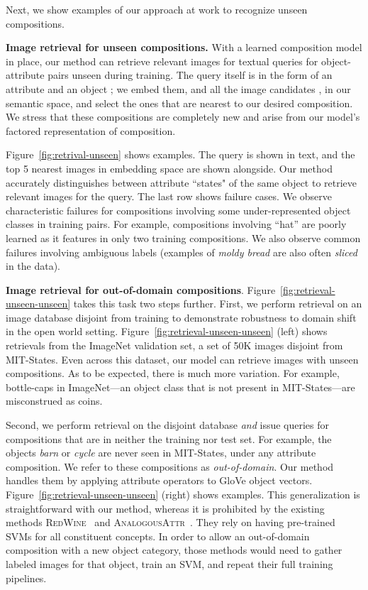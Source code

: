 \documentclass[runningheads]{llncs}
\newcommand{\SC}[1]{{\textsc{#1}}}
\newcommand{\reffig}[1]{Figure~\ref{#1}}
\begin{document}
Next, we show examples of our approach at work to recognize unseen compositions.

\vspace{0.05in}
\noindent\textbf{Image retrieval for unseen compositions.} With a learned composition model in place, our method can retrieve relevant images for textual queries for object-attribute pairs unseen during training. The query itself is in the form of an attribute  and an object ; we embed them, and all the image candidates , in our semantic space, and select the ones that are nearest to our desired composition. We stress that these compositions are completely new and arise from our model's factored representation of composition. 

\reffig{fig:retrival-unseen} shows examples. The query is shown in text, and the top 5 nearest images in embedding space are shown alongside. Our method accurately distinguishes between attribute ``states" of the same object to retrieve relevant images for the query. The last row shows failure cases. We observe characteristic failures for compositions involving some under-represented object classes in training pairs. For example, compositions involving ``hat'' are poorly learned as it features in only two training compositions. We also observe common failures involving ambiguous labels (examples of \emph{moldy bread} are also often \emph{sliced} in the data). 

\vspace{0.05in}
\noindent\textbf{Image retrieval for out-of-domain compositions}. 
\reffig{fig:retrieval-unseen-unseen} takes this task two steps further.  First, we perform retrieval on an image database disjoint from training to demonstrate robustness to domain shift in the open world setting.
\reffig{fig:retrieval-unseen-unseen} (left) shows retrievals from the ImageNet validation set, a set of 50K images disjoint from MIT-States. 
Even across this dataset, our model can retrieve images with unseen compositions. As to be expected, there is much more variation. For example, bottle-caps in ImageNet---an object class that is not present in MIT-States---are misconstrued as coins. 

Second, we perform retrieval on the disjoint database \emph{and} issue queries for compositions that are in neither the training nor test set.  For example, the objects \emph{barn} or \emph{cycle} are never seen in MIT-States, under any attribute composition.
We refer to these compositions as \emph{out-of-domain}. 
Our method handles them by applying attribute operators to GloVe object vectors.
\reffig{fig:retrieval-unseen-unseen} (right) shows examples.  
This generalization is straightforward with our method, whereas it is prohibited by the existing methods 
 \SC{RedWine}~\cite{misra2017red} and \SC{AnalogousAttr}~\cite{chen2014inferring}. They rely on having pre-trained SVMs for all constituent concepts. In order to allow an out-of-domain composition with a new object category, those methods would need to gather labeled images for that object, train an SVM, and repeat their full training pipelines.
\end{document}
